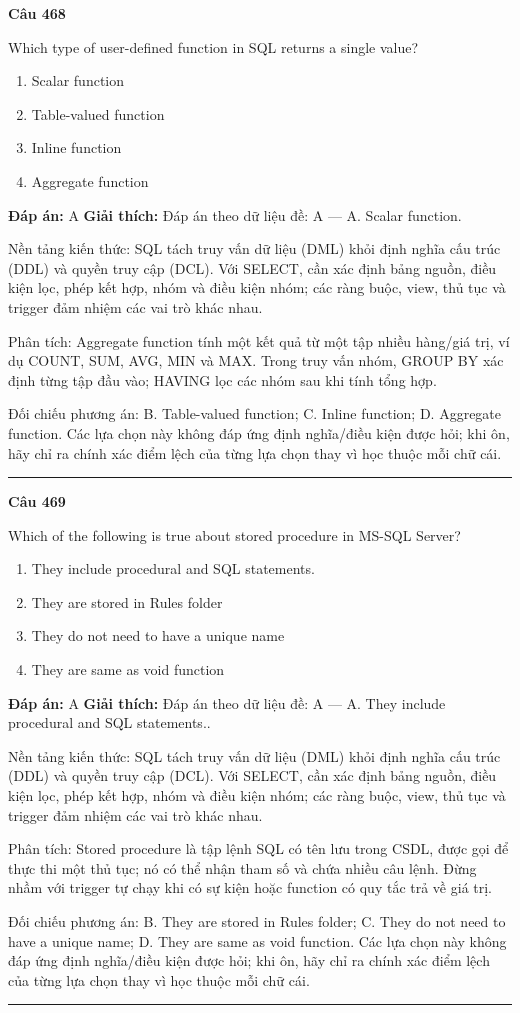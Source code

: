\documentclass[11pt,a4paper]{article}
\newenvironment{question}[1]{%
  \par\vspace{1em}\noindent\textbf{\large Câu #1}\par\vspace{0.4em}
}{%
  \par\vspace{1em}\hrule\vspace{0.6em}
}
\newenvironment{choices}{%
  \begin{enumerate}[label=\textbf{\Alph*.},leftmargin=2.2em,itemsep=2pt,topsep=3pt]
}{%
  \end{enumerate}
}
\newcommand{\choice}{\item}
\begin{document}
\begin{question}{468}
Which type of user-defined function in SQL returns a single value?
\begin{choices}
\choice Scalar function
\choice Table-valued function
\choice Inline function
\choice Aggregate function
\end{choices}
\textbf{Đáp án:} A
\textbf{Giải thích:} Đáp án theo dữ liệu đề: A — A. Scalar function.

Nền tảng kiến thức: SQL tách truy vấn dữ liệu (DML) khỏi định nghĩa cấu trúc (DDL) và quyền truy cập (DCL). Với SELECT, cần xác định bảng nguồn, điều kiện lọc, phép kết hợp, nhóm và điều kiện nhóm; các ràng buộc, view, thủ tục và trigger đảm nhiệm các vai trò khác nhau.

Phân tích: Aggregate function tính một kết quả từ một tập nhiều hàng/giá trị, ví dụ COUNT, SUM, AVG, MIN và MAX. Trong truy vấn nhóm, GROUP BY xác định từng tập đầu vào; HAVING lọc các nhóm sau khi tính tổng hợp.

Đối chiếu phương án: B. Table-valued function; C. Inline function; D. Aggregate function. Các lựa chọn này không đáp ứng định nghĩa/điều kiện được hỏi; khi ôn, hãy chỉ ra chính xác điểm lệch của từng lựa chọn thay vì học thuộc mỗi chữ cái.
\end{question}

\begin{question}{469}
Which of the following is true about stored procedure in MS-SQL Server?
\begin{choices}
\choice They include procedural and SQL statements.
\choice They are stored in Rules folder
\choice They do not need to have a unique name
\choice They are same as void function
\end{choices}
\textbf{Đáp án:} A
\textbf{Giải thích:} Đáp án theo dữ liệu đề: A — A. They include procedural and SQL statements..

Nền tảng kiến thức: SQL tách truy vấn dữ liệu (DML) khỏi định nghĩa cấu trúc (DDL) và quyền truy cập (DCL). Với SELECT, cần xác định bảng nguồn, điều kiện lọc, phép kết hợp, nhóm và điều kiện nhóm; các ràng buộc, view, thủ tục và trigger đảm nhiệm các vai trò khác nhau.

Phân tích: Stored procedure là tập lệnh SQL có tên lưu trong CSDL, được gọi để thực thi một thủ tục; nó có thể nhận tham số và chứa nhiều câu lệnh. Đừng nhầm với trigger tự chạy khi có sự kiện hoặc function có quy tắc trả về giá trị.

Đối chiếu phương án: B. They are stored in Rules folder; C. They do not need to have a unique name; D. They are same as void function. Các lựa chọn này không đáp ứng định nghĩa/điều kiện được hỏi; khi ôn, hãy chỉ ra chính xác điểm lệch của từng lựa chọn thay vì học thuộc mỗi chữ cái.
\end{question}
\end{document}
